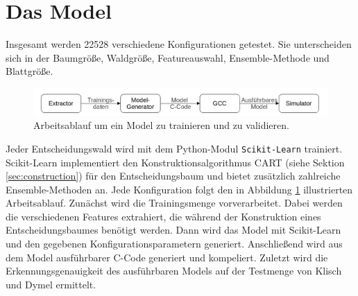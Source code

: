 \section{Das Model}
Insgesamt werden 22528 verschiedene Konfigurationen getestet. Sie unterscheiden sich in der Baumgröße, Waldgröße, Featureauswahl, Ensemble-Methode und Blattgröße.
\newline
\begin{figure}
    \centering
    \includegraphics[width=\linewidth]{images/model_workflow.jpg}
    \caption{Arbeitsablauf um ein Model zu trainieren und zu validieren.}
    \label{fig:model_workflow}
\end{figure}
\newline
Jeder Entscheidungswald wird mit dem Python-Modul \texttt{Scikit-Learn} trainiert. Scikit-Learn implementiert den Konstruktionsalgorithmus CART (siehe Sektion \ref{sec:construction}) für den Entscheidungsbaum und bietet
zusätzlich zahlreiche Ensemble-Methoden an. Jede Konfiguration folgt den in Abbildung \ref{fig:model_workflow} illustrierten Arbeitsablauf.
\newline
\newline
Zunächst wird die Trainingsmenge vorverarbeitet. Dabei werden die verschiedenen
Features extrahiert, die während der Konstruktion eines Entscheidungsbaumes benötigt werden. Dann wird das Model mit Scikit-Learn und den gegebenen Konfigurationsparametern generiert. Anschließend wird aus dem Model
ausführbarer C-Code generiert und kompeliert. Zuletzt wird die Erkennungsgenauigkeit des ausführbaren Models auf der Testmenge von Klisch und Dymel ermittelt.


